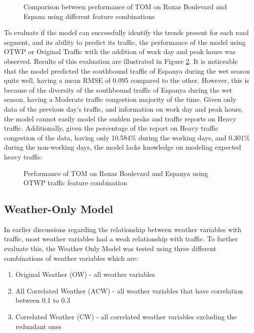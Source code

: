 \begin{figure}
  \centering
  \captionsetup{justification=centering}
  \caption{Comparison between performance of TOM on Roxas Boulevard and Espana using different feature combinations}
  \label{fig:tom_diff_feat_combi}
\end{figure}


To evaluate if the model can successfully identify the trends present for each road segment, and its ability to predict its traffic, the performance of the model using OTWP or Original Traffic with the addition of work day and peak hours was observed. Results of this evaluation are illustrated in Figure \ref{fig:tom_feat_combi_road}. It is noticeable that the model predicted the southbound traffic of Espanya during the wet season quite well, having a mean RMSE of 0.095 compared to the other. However, this is because of the diversity of the southbound traffic of Espanya during the wet season, having a Moderate traffic congestion majority of the time. Given only data of the previous day’s traffic, and information on work day and peak hours, the model cannot easily model the sudden peaks and traffic reports on Heavy traffic. Additionally, given the percentage of the report on Heavy traffic congestion of the data, having only 10.584\% during the working days, and 0.301\% during the non-working days, the model lacks knowledge on modeling expected heavy traffic. 

\begin{figure}
  \centering
  \captionsetup{justification=centering}
  \caption{Performance of TOM on Roxas Boulevard and Espanya using OTWP traffic feature combination}
  \label{fig:tom_feat_combi_road}
\end{figure}



\subsection{Weather-Only Model}
In earlier discussions regarding the relationship between weather variables with traffic, most weather variables had a weak relationship with traffic. To further evaluate this, the Weather Only Model was tested using three different combinations of weather variables which are:

\begin{enumerate}
\item Original Weather (OW) - all weather variables
\item All Correlated Weather (ACW) - all weather variables that have correlation between 0.1 to 0.3
\item Correlated Weather (CW) - all correlated weather variables excluding the redundant ones
\end{enumerate}

